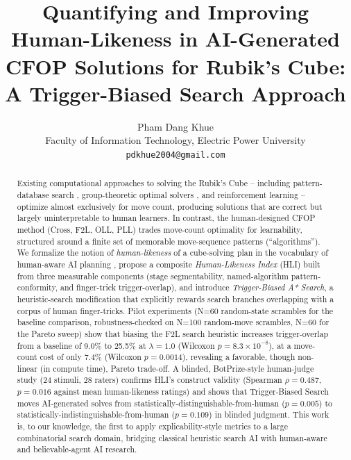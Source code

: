 \documentclass[10pt,conference]{article}
\title{Quantifying and Improving Human-Likeness in AI-Generated CFOP
Solutions for Rubik's Cube: A Trigger-Biased Search Approach}
\author{
  Pham Dang Khue \\
  Faculty of Information Technology, Electric Power University\\
  \texttt{pdkhue2004@gmail.com}
}
\date{}
\begin{document}
\maketitle

\begin{abstract}
Existing computational approaches to solving the Rubik's Cube --
including pattern-database search \citep{korf1997}, group-theoretic
optimal solvers \citep{rokicki2014,kociemba}, and reinforcement
learning \citep{mcaleer2018} -- optimize almost exclusively for move
count, producing solutions that are correct but largely
uninterpretable to human learners. In contrast, the human-designed
CFOP method (Cross, F2L, OLL, PLL) trades move-count optimality for
learnability, structured around a finite set of memorable
move-sequence patterns (``algorithms''). We formalize the notion of
\emph{human-likeness} of a cube-solving plan in the vocabulary of
human-aware AI planning \citep{kulkarni2016,chakraborti2019},
propose a composite \emph{Human-Likeness Index} (HLI) built from
three measurable components (stage segmentability, named-algorithm
pattern-conformity, and finger-trick trigger-overlap), and introduce
\emph{Trigger-Biased A* Search}, a heuristic-search modification that
explicitly rewards search branches overlapping with a corpus of
human finger-tricks. Pilot experiments (N=60 random-state scrambles for
the baseline comparison, robustness-checked on N=100 random-move
scrambles, N=60 for the Pareto sweep) show that biasing the F2L search
heuristic increases trigger-overlap from a baseline of 9.0\% to 25.5\% at $\lambda=1.0$
(Wilcoxon $p=8.3\times10^{-8}$), at a move-count cost of only 7.4\%
(Wilcoxon $p=0.0014$), revealing a favorable, though non-linear (in
compute time), Pareto trade-off. A blinded, BotPrize-style
\citep{hingston2009} human-judge study (24 stimuli, 28 raters)
confirms HLI's construct validity (Spearman $\rho=0.487$,
$p=0.016$ against mean human-likeness ratings) and shows that
Trigger-Biased Search moves AI-generated solves from
statistically-distinguishable-from-human ($p=0.005$) to
statistically-indistinguishable-from-human ($p=0.109$) in blinded
judgment. This work is, to our knowledge, the first
to apply explicability-style metrics to a large combinatorial search
domain, bridging classical heuristic search AI with human-aware and
believable-agent AI research.
\end{abstract}

\end{document}
